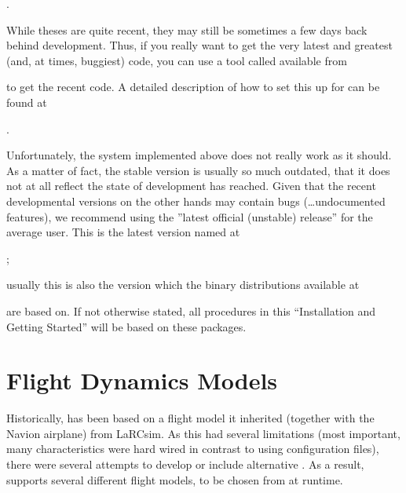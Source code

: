 .
 \medskip

 \noindent
While theses are quite recent, they may still be sometimes a few days back behind
development. Thus, if you really want to get the very latest and greatest (and, at times,
buggiest) code, you can use a tool called 
available from
 \medskip

 \medskip

 \noindent
to get the recent code. A detailed description of how to set this up for \FlightGear{}
can be found at
 \medskip

.
 \medskip

 \noindent
 Unfortunately, the system implemented above does not really work as it should. As a matter of
 fact, the stable version is usually so much outdated, that it does not at all reflect the state
 of development \FlightGear{} has reached. Given that the recent developmental versions on the
 other hands may contain bugs (\ldots undocumented features), we recommend using the
 ''latest official (unstable) release'' for the average user. This is the latest version named at

 ;
 \medskip

\noindent
 usually this is also the version which the binary distributions
 available at
 \medskip

 \medskip

 \noindent
 are based on. If not otherwise stated, all procedures in this ``Installation and Getting Started''
 will be based on these packages.

\section{Flight Dynamics Models\label{flight models}}
Historically, \FlightGear{} has been based on a flight model it inherited (together
with the Navion airplane) from LaRCsim. As this had several limitations (most important,
many characteristics were hard wired in contrast to using configuration files), there were
several attempts to develop or include alternative . As a result,
\FlightGear{} supports several different flight models, to be chosen from at runtime.

